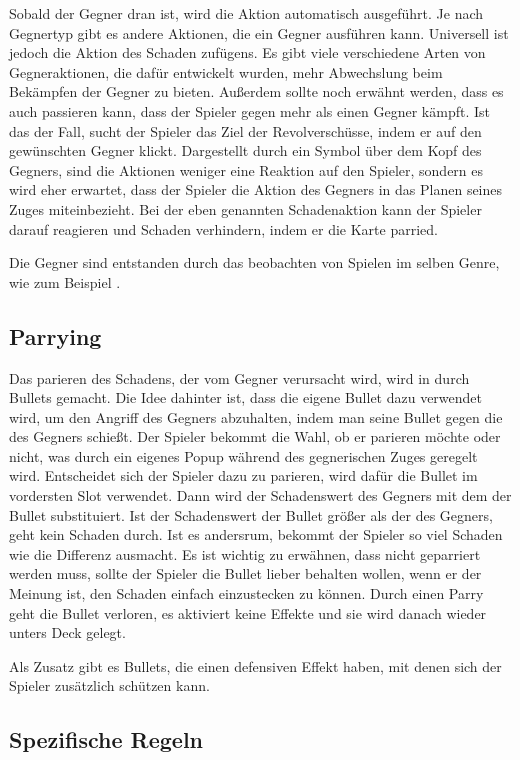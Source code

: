 Sobald der Gegner dran ist, wird die Aktion automatisch ausgeführt. Je nach Gegnertyp gibt es andere Aktionen,
die ein Gegner ausführen kann. Universell ist jedoch die Aktion des Schaden zufügens.
Es gibt viele verschiedene Arten von Gegneraktionen, die dafür entwickelt wurden, mehr Abwechslung beim Bekämpfen der Gegner zu bieten.
Außerdem sollte noch erwähnt werden, dass es auch passieren kann, dass der Spieler gegen mehr als einen Gegner kämpft.
Ist das der Fall, sucht der Spieler das Ziel der Revolverschüsse, indem er auf den gewünschten Gegner klickt.
Dargestellt durch ein Symbol über dem Kopf des Gegners, sind die Aktionen weniger eine Reaktion auf den Spieler,
sondern es wird eher erwartet, dass der Spieler die Aktion des Gegners in das Planen seines Zuges miteinbezieht.
Bei der eben genannten Schadenaktion kann der Spieler darauf reagieren und Schaden verhindern, indem er die Karte parried.

Die Gegner sind entstanden durch das beobachten von Spielen im selben Genre, wie zum Beispiel  . 

\subsection{Parrying}\label{parrying}
Das parieren des Schadens, der vom Gegner verursacht wird, wird in \FF durch Bullets gemacht.
Die Idee dahinter ist, dass die eigene Bullet dazu verwendet wird, um den Angriff des Gegners abzuhalten, indem man
seine Bullet gegen die des Gegners schießt.
Der Spieler bekommt die Wahl, ob er parieren möchte oder nicht, was durch ein eigenes Popup während des gegnerischen Zuges geregelt wird.
Entscheidet sich der Spieler dazu zu parieren, wird dafür die Bullet im vordersten Slot verwendet.
Dann wird der Schadenswert des Gegners mit dem der Bullet substituiert. Ist der Schadenswert der Bullet größer als der des Gegners,
geht kein Schaden durch. Ist es andersrum, bekommt der Spieler so viel Schaden wie die Differenz ausmacht.
Es ist wichtig zu erwähnen, dass nicht geparriert werden muss, sollte der Spieler die Bullet lieber behalten wollen,
\bzw wenn er der Meinung ist, den Schaden einfach einzustecken zu können. Durch einen Parry geht die Bullet verloren,
es aktiviert keine Effekte und sie wird danach wieder unters Deck gelegt.


Als Zusatz gibt es Bullets, die einen defensiven Effekt haben, mit denen sich der Spieler zusätzlich schützen kann.

\subsection{Spezifische Regeln}\label{spezifische_regeln}

